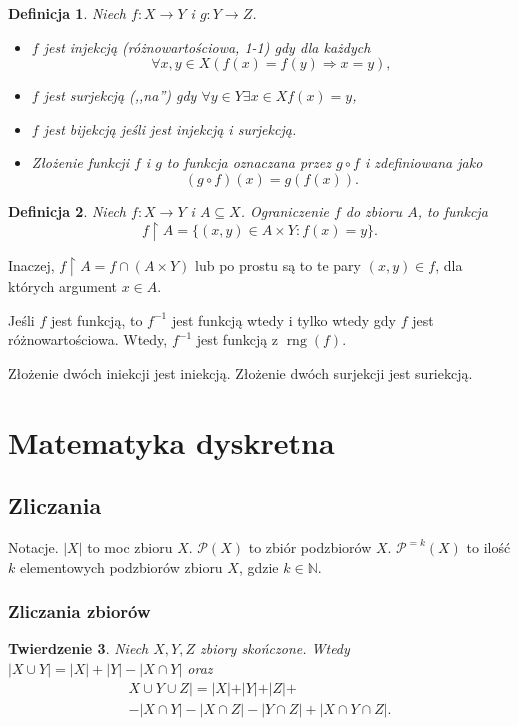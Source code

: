 \documentclass[12pt]{article}
\newcommand{\isfunc}[3]{{{#1}\colon{#2}\rightarrow{#3}}}
\newcommand{\cP}{\mathcal{P}}
\newcommand{\bN}{\mathbb{N}}
\newcommand{\imp}{\Rightarrow}
\newtheorem{thm}{Twierdzenie}
\newtheorem{dfn}[thm]{Definicja}
\DeclareMathOperator{\rng}{rng}
\begin{document}
\begin{dfn}
	Niech $\isfunc{f}{X}{Y}$ i $\isfunc{g}{Y}{Z}$.
	\begin{itemize}
		\item $f$ jest injekcją (różnowartościowa, 1-1) gdy
		dla każdych \[\forall x,y \in X (f(x)=f(y)\imp x=y) ,\]
		\item $f$ jest surjekcją (,,na'') gdy 
		$\forall y\in Y\exists x\in X f(x)=y$,
		\item $f$ jest bijekcją jeśli jest injekcją i surjekcją.
		\item 
		Złożenie funkcji $f$ i $g$ to funkcja oznaczana przez
		$g\circ f$ i zdefiniowana jako
		\[
		(g\circ f)(x)= g(f(x)).
		\]
	\end{itemize}
\end{dfn}

\begin{dfn}
	Niech $\isfunc{f}{X}{Y}$ i $A\subseteq X$. 
	Ograniczenie $f$ do zbioru $A$, to funkcja 
	$$
	f\upharpoonright A = \{ (x,y)\in A\times Y \colon f(x) = y\}.
	$$
\end{dfn}
Inaczej, $f\upharpoonright A = f \cap (A\times Y)$ lub po prostu
są to te pary $(x,y)\in f$, dla których argument $x\in A$.


Jeśli $f$ jest funkcją, to $f^{-1}$ jest funkcją wtedy i tylko wtedy
gdy $f$ jest różnowartościowa. Wtedy, $f^{-1}$ jest funkcją z $\rng(f)$.

Złożenie dwóch iniekcji jest iniekcją. Złożenie dwóch surjekcji 
jest suriekcją.
 

\section{Matematyka dyskretna}
\subsection{Zliczania}

Notacje. $|X|$ to moc zbioru $X$.
$\cP(X)$ to zbiór podzbiorów $X$.
$\cP^{=k}(X)$ to ilość $k$ elementowych podzbiorów 
zbioru $X$, gdzie $k\in\bN$.




\subsubsection{Zliczania zbiorów}



\begin{thm}
	Niech $X,Y, Z$ zbiory skończone. Wtedy 
		$|X\cup Y|=|X|+|Y|-|X\cap Y|$ oraz
		 \begin{multline*}
		 	X\cup Y\cup Z|= |X|+|Y|+|Z|+ \\
		 	- |X\cap Y| - |X\cap Z| - |Y\cap Z| + |X\cap Y\cap Z|.
		 \end{multline*} 
\end{thm}
\end{document}

